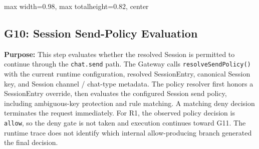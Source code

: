 \begin{center}
\begin{adjustbox}{
max width=0.98\textwidth,
max totalheight=0.82\textheight,
center
}

\end{adjustbox}

\end{center}


\subsection*{G10: Session Send-Policy Evaluation}

\textbf{Purpose:}
This step evaluates whether the resolved Session is permitted to
continue through the \texttt{chat.send} path. The Gateway calls
\texttt{resolveSendPolicy()} with the current runtime configuration,
resolved SessionEntry, canonical Session key, and Session channel /
chat-type metadata. The policy resolver first honors a SessionEntry
override, then evaluates the configured Session send policy, including
ambiguous-key protection and rule matching. A matching deny decision
terminates the request immediately. For R1, the observed policy
decision is \texttt{allow}, so the deny gate is not taken and execution
continues toward G11. The runtime trace does not identify which internal
allow-producing branch generated the final decision.

